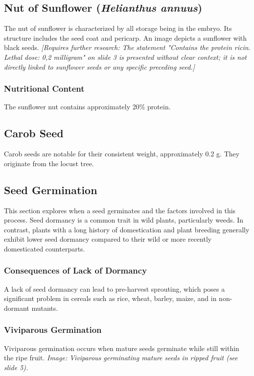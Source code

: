 \subsection{Nut of Sunflower (\textit{Helianthus annuus})} 
The nut of sunflower is characterized by all storage being in the embryo. Its structure includes the seed coat and pericarp. An image depicts a sunflower with black seeds. \textit{[Requires further research: The statement "Contains the protein ricin. Lethal dose: 0,2 milligram" on slide 3 is presented without clear context; it is not directly linked to sunflower seeds or any specific preceding seed.]}

\subsubsection{Nutritional Content} 
The sunflower nut contains approximately 20\% protein.

\subsection{Carob Seed} 
Carob seeds are notable for their consistent weight, approximately 0.2 g. They originate from the locust tree.

\subsection{Seed Germination} 
This section explores when a seed germinates and the factors involved in this process. Seed dormancy is a common trait in wild plants, particularly weeds. In contrast, plants with a long history of domestication and plant breeding generally exhibit lower seed dormancy compared to their wild or more recently domesticated counterparts.

\subsubsection{Consequences of Lack of Dormancy} 
A lack of seed dormancy can lead to pre-harvest sprouting, which poses a significant problem in cereals such as rice, wheat, barley, maize, and in non-dormant mutants.

\subsubsection{Viviparous Germination} 
Viviparous germination occurs when mature seeds germinate while still within the ripe fruit. \textit{Image: Viviparous germinating mature seeds in ripped fruit (see slide 5).}

